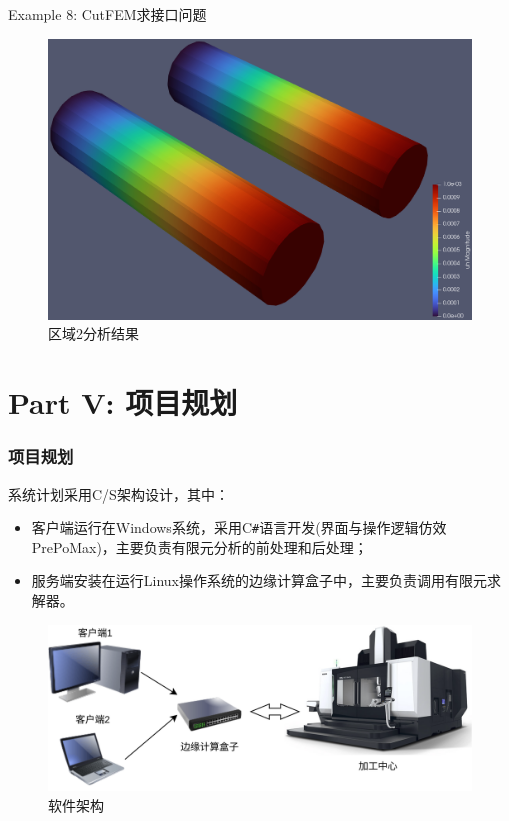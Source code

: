 \documentclass[lang=en,aspectratio=43,theme=default,logo=on]{simplebeamer}
\begin{document}
\begin{frame}{Example 8: CutFEM求接口问题}
    \begin{figure}
        \centering %
        \includegraphics[height=0.7\textheight]{./img/029.png}
        \caption{区域2分析结果}
    \end{figure}
\end{frame}

\section{Part V: 项目规划}

\begin{frame}[fragile]
    \frametitle{项目规划}
系统计划采用C/S架构设计，其中：
\begin{itemize}
    \item 客户端运行在Windows系统，采用C\verb|#|语言开发(界面与操作逻辑仿效PrePoMax)，主要负责有限元分析的前处理和后处理；
    \item 服务端安装在运行Linux操作系统的边缘计算盒子中，主要负责调用有限元求解器。
\end{itemize}
    \begin{figure}
        \centering %
        \includegraphics[height=0.4\textheight]{./img/031.png}
        \caption{软件架构}
    \end{figure}
\end{frame}
\end{document}
